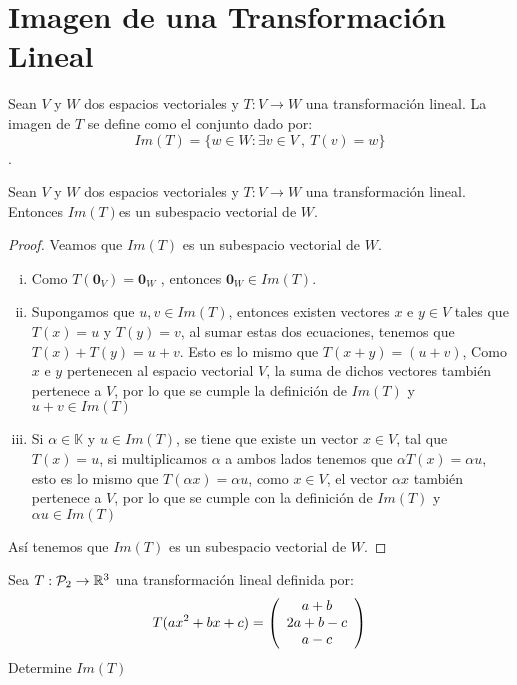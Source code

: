 \section{Imagen de una Transformación Lineal}
Sean $V$ y $W$ dos espacios vectoriales y $T : V \to W$ una transformación lineal. La imagen de $T$ se define como el conjunto dado por: 
$$Im(T) = \{w \in W: \exists v \in V\ , \ T(v) = w\}$$.
\begin{theorem}
Sean $V$ y $W$ dos espacios vectoriales y $T : V \to W$ una transformación lineal. Entonces $Im(T)$es un subespacio vectorial de $W$.
\end{theorem}

\begin{proof}
Veamos que $Im(T)$ es un subespacio vectorial de $W$.
\begin{enumerate}[i.]
\item Como $T(\mathbf{0}_V)=\mathbf{0}_W$ , entonces $\mathbf{0}_W \in Im(T)$.
\item Supongamos que $u , v \in Im(T)$, entonces existen vectores $x$ e $y \in V$ tales que $T(x) = u$ y $T(y) = v$, al sumar estas dos ecuaciones, tenemos que $T(x) + T(y) = u + v$. Esto es lo mismo que $T(x + y) = (u + v)$, Como $x$ e $y$ pertenecen al espacio vectorial $V$, la suma de dichos vectores también pertenece a $V$, por lo que se cumple la definición de $Im(T)$ y $u+ v \in Im(T)$
\item Si $\alpha \in \mathbb{K}$ y $u \in Im(T)$, se tiene que
existe un vector $x \in V$, tal que $T(x) = u$, si multiplicamos $\alpha$ a ambos lados tenemos que $\alpha T(x) = \alpha u$, esto es lo mismo que $T(\alpha x) = \alpha u$, como $x \in V$, el vector $\alpha x$ también pertenece a $V$, por lo que se cumple con la definición de $Im(T)$ y $\alpha u \in Im(T)$
\end{enumerate}
Así tenemos que $Im(T)$ es un subespacio vectorial de $W$.
\end{proof}

\begin{ejemplo}
Sea $T: \mathcal{P}_2 \to \mathbb{R}^3$ una transformación lineal definida por:
$$T(ax^2 + bx + c) = \left( \begin{array}{c} a+b\\ 2a+b-c\\ a-c \end{array} \right) $$
Determine $Im(T)$
\end{ejemplo}

